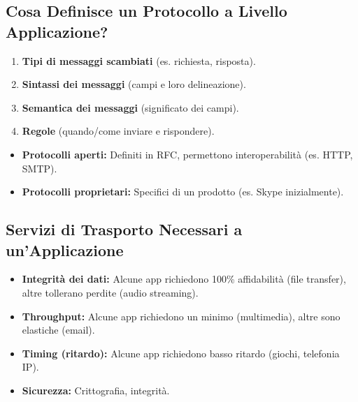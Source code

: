 \subsection{Cosa Definisce un Protocollo a Livello Applicazione?}
\begin{enumerate}
    \item \textbf{Tipi di messaggi scambiati} (es. richiesta, risposta).
    \item \textbf{Sintassi dei messaggi} (campi e loro delineazione).
    \item \textbf{Semantica dei messaggi} (significato dei campi).
    \item \textbf{Regole} (quando/come inviare e rispondere).
\end{enumerate}
\begin{itemize}
    \item \textbf{Protocolli aperti:} Definiti in RFC, permettono interoperabilità (es. HTTP, SMTP).
    \item \textbf{Protocolli proprietari:} Specifici di un prodotto (es. Skype inizialmente).
\end{itemize}

\subsection{Servizi di Trasporto Necessari a un'Applicazione}
\begin{itemize}
    \item \textbf{Integrità dei dati:} Alcune app richiedono 100\% affidabilità (file transfer), altre tollerano perdite (audio streaming).
    \item \textbf{Throughput:} Alcune app richiedono un minimo (multimedia), altre sono elastiche (email).
    \item \textbf{Timing (ritardo):} Alcune app richiedono basso ritardo (giochi, telefonia IP).
    \item \textbf{Sicurezza:} Crittografia, integrità.
\end{itemize}

